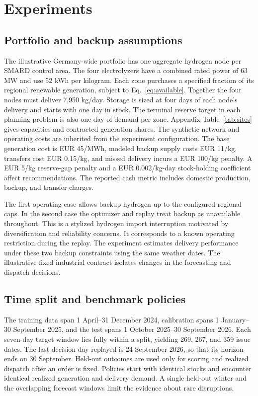 \section{Experiments}
\label{sec:experiments}

\subsection{Portfolio and backup assumptions}
The illustrative Germany-wide portfolio has one aggregate hydrogen node per SMARD control area. The four electrolyzers have a combined rated power of 63 MW and use 52 kWh per kilogram. Each zone purchases a specified fraction of its regional renewable generation, subject to Eq.~\eqref{eq:available}. Together the four nodes must deliver 7{,}950 kg/day. Storage is sized at four days of each node's delivery and starts with one day in stock. The terminal reserve target in each planning problem is also one day of demand per zone. Appendix Table~\ref{tab:sites} gives capacities and contracted generation shares. The synthetic network and operating costs are inherited from the experiment configuration. The base generation cost is EUR 45/MWh, modeled backup supply costs EUR 11/kg, transfers cost EUR 0.15/kg, and missed delivery incurs a EUR 100/kg penalty. A EUR 5/kg reserve-gap penalty and a EUR 0.002/kg-day stock-holding coefficient affect recommendations. The reported cash metric includes domestic production, backup, and transfer charges.

The first operating case allows backup hydrogen up to the configured regional caps. In the second case the optimizer and replay treat backup as unavailable throughout. This is a stylized hydrogen import interruption motivated by diversification and reliability concerns. It corresponds to a known operating restriction during the replay. The experiment estimates delivery performance under these two backup constraints using the same weather dates. The illustrative fixed industrial contract isolates changes in the forecasting and dispatch decisions.

\subsection{Time split and benchmark policies}
The training data span 1 April--31 December 2024, calibration spans 1 January--30 September 2025, and the test spans 1 October 2025--30 September 2026. Each seven-day target window lies fully within a split, yielding 269, 267, and 359 issue dates. The last decision day replayed is 24 September 2026, so that its horizon ends on 30 September. Held-out outcomes are used only for scoring and realized dispatch after an order is fixed. Policies start with identical stocks and encounter identical realized generation and delivery demand. A single held-out winter and the overlapping forecast windows limit the evidence about rare disruptions.

